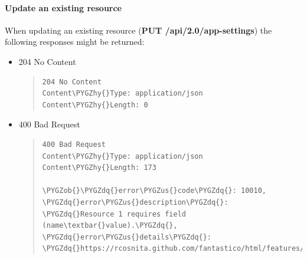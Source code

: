 \documentclass[letterpaper,10pt,english]{sphinxmanual}
\def\PYGZus{\char`\_}
\def\PYGZob{\char`\{}
\def\PYGZcb{\char`\}}
\def\PYGZhy{\char`\-}
\def\PYGZdq{\char`\"}
\begin{document}
\paragraph{Update an existing resource}
\label{features/roa/rest_responses:update-an-existing-resource}
When updating an existing resource (\textbf{PUT /api/2.0/app-settings}) the following responses might be returned:
\begin{itemize}
\item {} 
204 No Content
\begin{quote}

\begin{Verbatim}[commandchars=\\\{\}]
204 No Content
Content\PYGZhy{}Type: application/json
Content\PYGZhy{}Length: 0
\end{Verbatim}
\end{quote}

\item {} 
400 Bad Request
\begin{quote}

\begin{Verbatim}[commandchars=\\\{\}]
400 Bad Request
Content\PYGZhy{}Type: application/json
Content\PYGZhy{}Length: 173

\PYGZob{}\PYGZdq{}error\PYGZus{}code\PYGZdq{}: 10010, \PYGZdq{}error\PYGZus{}description\PYGZdq{}: \PYGZdq{}Resource 1 requires field (name\textbar{}value).\PYGZdq{}, \PYGZdq{}error\PYGZus{}details\PYGZdq{}: \PYGZdq{}https://rcosnita.github.com/fantastico/html/features/roa/1000x.html\PYGZdq{}\PYGZcb{}
\end{Verbatim}
\end{quote}

\end{itemize}
\end{document}
